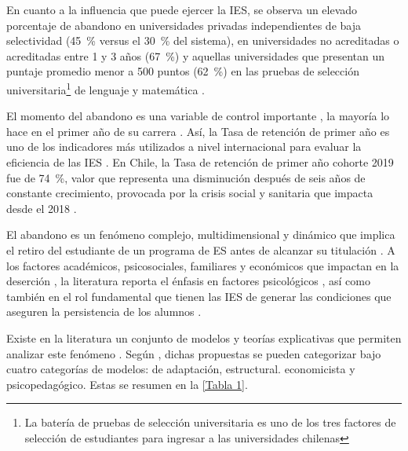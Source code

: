 \documentclass[portuguese]{textolivre}
\begin{document}
En cuanto a la influencia que puede ejercer la IES, se observa un elevado porcentaje de abandono en universidades privadas independientes \cite{UNESCO-UIS/OECD/EUROSTAT2005} de baja selectividad (45~\% versus el 30~\% del sistema), en universidades no acreditadas o acreditadas entre 1 y 3 años (67~\%) y aquellas universidades que presentan un puntaje promedio menor a 500 puntos (62~\%) en las pruebas de selección universitaria\footnote{La batería de pruebas de selección universitaria es uno de los tres factores de selección de estudiantes para ingresar a las universidades chilenas}  de lenguaje y matemática \cite{Larroucau2015}.

El momento del abandono es una variable de control importante \cite{Kehm2020}, la mayoría lo hace en el primer año de su carrera \cite{Ferreyra2017}. Así, la Tasa de retención de primer año es uno de los indicadores más utilizados a nivel internacional para evaluar la eficiencia de las IES \cite{ServiciodeInformaciondeEducacionSuperiorSIES2020}. En Chile, la Tasa de retención de primer año cohorte 2019 fue de 74~\%, valor que representa una disminución después de seis años de constante crecimiento, provocada por la crisis social y sanitaria que impacta desde el 2018 \cite{ServiciodeInformaciondeEducacionSuperiorSIES2020}.

El abandono es un fenómeno complejo, multidimensional y dinámico que implica el retiro del estudiante de un programa de ES antes de alcanzar su titulación \cite{ProyectoAlfaGuia,Himmel2002,ServiciodeInformaciondeEducacionSuperiorSIES2019,CalvacheF.2018,Delen2010,Munizaga2018}. A los factores académicos, psicosociales, familiares y económicos que impactan en la deserción \cite{Hossler1990,Tinto1998,Ishitani2002,St.John2000}, la literatura reporta el énfasis en factores psicológicos \cite{Medrano2010,Cabrera2006a,Rosario2012}, así como también en el rol fundamental que tienen las IES de generar las condiciones que aseguren la persistencia de los alumnos \cite{Tinto1998,Kuh2010,Francisco2011,Braxton2002}.

Existe en la literatura un conjunto de modelos y teorías explicativas que permiten analizar este fenómeno \cite{Spady1970,Tinto1975,Tinto2005c,Bean1985a,Ethington1990,Nora1990,Braxton1997}. Según \cite{Cabrera2006}, dichas propuestas se pueden categorizar bajo cuatro categorías de modelos: de adaptación, estructural. economicista y psicopedagógico. Estas se resumen en la \cref{Tabla 1}.
\end{document}
